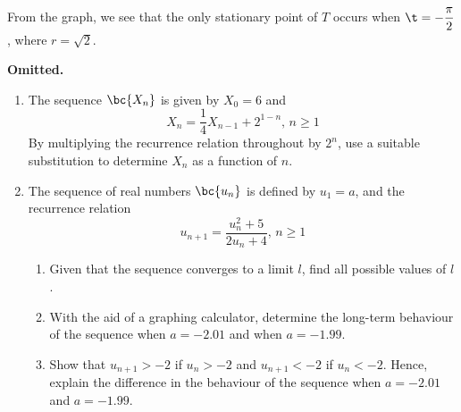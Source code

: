 \documentclass{echw}
\begin{document}
             From the graph, we see that the only stationary point of $T$ occurs when $\t = -\dfrac\pi2$, where $r = \sqrt2$.

    \problem{}
        \textbf{Omitted.}

    \problem{}
        \begin{enumerate}
            \item The sequence $\bc{X_n}$ is given by $X_0 = 6$ and
            \begin{equation*}
                X_n = \dfrac14 X_{n-1} + 2^{1-n}, \, n \geq 1
            \end{equation*}
            By multiplying the recurrence relation throughout by $2^n$, use a suitable substitution to determine $X_n$ as a function of $n$.
            \item The sequence of real numbers $\bc{u_n}$ is defined by $u_1 = a$, and the recurrence relation
            \begin{equation*}
                u_{n+1} = \dfrac{u_n^2 + 5}{2u_n + 4}, \, n \geq 1
            \end{equation*}
            \begin{enumerate}
                \item Given that the sequence converges to a limit $l$, find all possible values of $l$.
                \item With the aid of a graphing calculator, determine the long-term behaviour of the sequence when $a = -2.01$ and when $a = -1.99$.
                \item Show that $u_{n+1} > -2$ if $u_n > -2$ and $u_{n+1} < -2$ if $u_n < -2$. Hence, explain the difference in the behaviour of the sequence when $a = -2.01$ and $a = -1.99$.
            \end{enumerate}
        \end{enumerate}

    \solution
\end{document}
